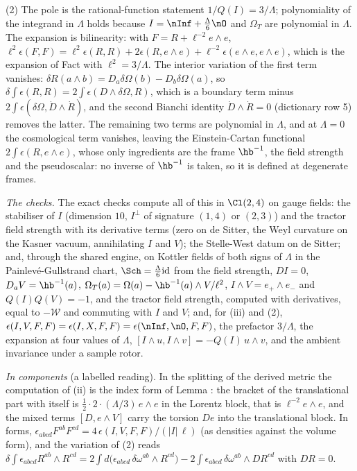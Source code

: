 (2) The pole is the rational-function statement $1/Q(I) = 3/\Lambda$; polynomiality of the integrand in $\Lambda$ holds because $I = \nInf + \tfrac{\Lambda}{6}\nO$ and $\Omega_{T}$ are polynomial in $\Lambda$. The expansion is bilinearity: with $F = R + \ell^{-2}e\wedge e$, $\ell^{2}\epsilon(F, F) = \ell^{2}\epsilon(R, R) + 2\epsilon(R, e\wedge e) + \ell^{-2}\epsilon(e\wedge e, e\wedge e)$, which is the expansion of Fact  with $\ell^{2} = 3/\Lambda$. The interior variation of the first term vanishes: $\delta R(a\wedge b) = D_{a}\delta\Omega(b) - D_{b}\delta\Omega(a)$, so $\delta\int\epsilon(R, R) = 2\int\epsilon(D\wedge\delta\Omega, R)$, which is a boundary term minus $2\int\epsilon(\delta\Omega, \dot D\wedge\dot R)$, and the second Bianchi identity $\dot D\wedge\dot R = 0$ (dictionary row 5) removes the latter. The remaining two terms are polynomial in $\Lambda$, and at $\Lambda = 0$ the cosmological term vanishes, leaving the Einstein-Cartan functional $2\int\epsilon(R, e\wedge e)$, whose only ingredients are the frame $\hb^{-1}$, the field strength and the pseudoscalar: no inverse of $\hb^{-1}$ is taken, so it is defined at degenerate frames.

\emph{The checks.} The exact checks compute all of this in $\Cl(2,4)$ on gauge fields: the stabiliser of $I$ (dimension $10$, $I^{\perp}$ of signature $(1,4)$ or $(2,3)$) and the tractor field strength with its derivative terms (zero on de Sitter, the Weyl curvature on the Kasner vacuum, annihilating $I$ and $V$); the Stelle-West datum on de Sitter; and, through the shared engine, on Kottler fields of both signs of $\Lambda$ in the Painlev\'e-Gullstrand chart, $\Sch = \tfrac{\Lambda}{6}\mathrm{id}$ from the field strength, $D I = 0$, $D_{a}V = \hb^{-1}(a)$, $\Omega_{T}(a) = \Omega(a) - \hb^{-1}(a)\wedge V/\ell^{2}$, $I\wedge V = e_{+}\wedge e_{-}$ and $Q(I)Q(V) = -1$, and the tractor field strength, computed with derivatives, equal to $-\mathcal{W}$ and commuting with $I$ and $V$; and, for (iii) and (2), $\epsilon(I, V, F, F) = \epsilon(I, X, F, F) = \epsilon(\nInf, \nO, F, F)$, the prefactor $3/\Lambda$, the expansion at four values of $\Lambda$, $[I\wedge u, I\wedge v] = -Q(I)\,u\wedge v$, and the ambient invariance under a sample rotor.

\emph{In components} (a labelled reading). In the splitting of the derived metric the computation of (ii) is the index form of Lemma : the bracket of the translational part with itself is $\tfrac12\cdot 2\cdot(\Lambda/3)\,e\wedge e$ in the Lorentz block, that is $\ell^{-2}e\wedge e$, and the mixed terms $[D, e\wedge V]$ carry the torsion $De$ into the translational block. In forms, $\epsilon_{abcd}F^{ab}F^{cd} = 4\,\epsilon(I, V, F, F)/(|I|\,\ell)$ (as densities against the volume form), and the variation of (2) reads $\delta\int\epsilon_{abcd}R^{ab}\wedge R^{cd} = 2\int d\bigl(\epsilon_{abcd}\,\delta\omega^{ab}\wedge R^{cd}\bigr) - 2\int\epsilon_{abcd}\,\delta\omega^{ab}\wedge DR^{cd}$ with $DR = 0$.
